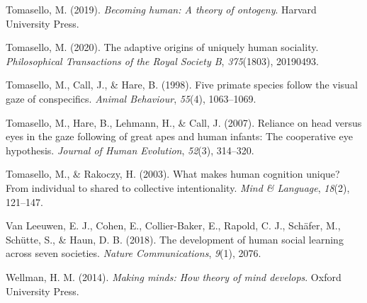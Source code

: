 \documentclass[
  man,floatsintext]{apa6}
\newlength{\cslhangindent}
\newlength{\cslentryspacingunit} %
\newenvironment{CSLReferences}[2] %
 {%
  \setlength{\parindent}{0pt}
  \ifodd #1
  \let\oldpar\par
  \def\par{\hangindent=\cslhangindent\oldpar}
  \fi
  \setlength{\parskip}{#2\cslentryspacingunit}
 }%
 {}
\begin{document}
\begin{CSLReferences}{1}{0}
\leavevmode{}%
Tomasello, M. (2019). \emph{Becoming human: A theory of ontogeny}. Harvard University Press.

\leavevmode{}%
Tomasello, M. (2020). The adaptive origins of uniquely human sociality. \emph{Philosophical Transactions of the Royal Society B}, \emph{375}(1803), 20190493.

\leavevmode{}%
Tomasello, M., Call, J., \& Hare, B. (1998). Five primate species follow the visual gaze of conspecifics. \emph{Animal Behaviour}, \emph{55}(4), 1063--1069.

\leavevmode{}%
Tomasello, M., Hare, B., Lehmann, H., \& Call, J. (2007). Reliance on head versus eyes in the gaze following of great apes and human infants: The cooperative eye hypothesis. \emph{Journal of Human Evolution}, \emph{52}(3), 314--320.

\leavevmode{}%
Tomasello, M., \& Rakoczy, H. (2003). What makes human cognition unique? From individual to shared to collective intentionality. \emph{Mind \& Language}, \emph{18}(2), 121--147.

\leavevmode{}%
Van Leeuwen, E. J., Cohen, E., Collier-Baker, E., Rapold, C. J., Schäfer, M., Schütte, S., \& Haun, D. B. (2018). The development of human social learning across seven societies. \emph{Nature Communications}, \emph{9}(1), 2076.

\leavevmode{}%
Wellman, H. M. (2014). \emph{Making minds: How theory of mind develops}. Oxford University Press.

\end{CSLReferences}
\end{document}

